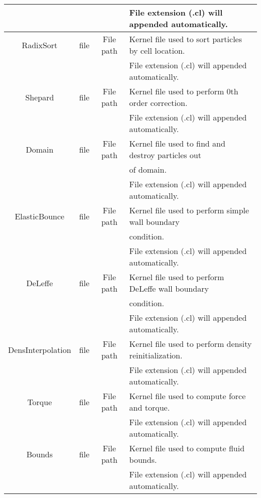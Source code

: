 \begin{table}[h!b!p!]
\begin{tabular}{| c | c | c | l | }
		                  &      &           & File extension (.cl) will appended automatically. \\
		\hline
		RadixSort         & file & File path & Kernel file used to sort particles by cell location. \\
		                  &      &           & File extension (.cl) will appended automatically. \\
		\hline
		Shepard           & file & File path & Kernel file used to perform 0th order correction. \\
		                  &      &           & File extension (.cl) will appended automatically. \\
		\hline
		Domain            & file & File path & Kernel file used to find and destroy particles out \\
		                  &      &           & of domain. \\
		                  &      &           & File extension (.cl) will appended automatically. \\
		\hline
		ElasticBounce     & file & File path & Kernel file used to perform simple wall boundary \\
		                  &      &           & condition. \\
		                  &      &           & File extension (.cl) will appended automatically. \\
		\hline
		DeLeffe           & file & File path & Kernel file used to perform DeLeffe wall boundary \\
		                  &      &           & condition. \\
		                  &      &           & File extension (.cl) will appended automatically. \\
		\hline
		DensInterpolation & file & File path & Kernel file used to perform density reinitialization. \\
		                  &      &           & File extension (.cl) will appended automatically. \\
		\hline
		Torque            & file & File path & Kernel file used to compute force and torque. \\
		                  &      &           & File extension (.cl) will appended automatically. \\
		\hline
		Bounds            & file & File path & Kernel file used to compute 
		fluid bounds. \\
		                  &      &           & File extension (.cl) will 
		                  appended automatically. \\

\end{tabular}
\end{table}
